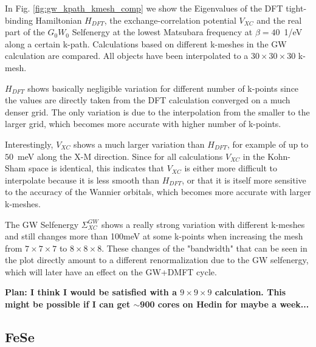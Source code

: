 \documentclass[12pt,a4paper]{scrartcl}
\numberwithin{equation}{section}
\begin{document}
In Fig. \ref{fig:gw_kpath_kmesh_comp} we show 
the Eigenvalues of the DFT tight-binding Hamiltonian $H_{DFT}$,
the exchange-correlation potential $V_{XC}$ and the real part of the $G_0W_0$ 
Selfenergy at the lowest Matsubara frequency at $\beta=40$\ 1/eV
along a certain k-path. Calculations based on different k-meshes in the GW calculation
are compared.
All objects have been interpolated to a $30\times30\times30$ k-mesh.

$H_{DFT}$ shows basically negligible variation for different number of k-points 
since the values are directly taken from the DFT calculation converged on a much denser grid.
The only variation is due to the interpolation from the smaller to the larger grid,
which becomes more accurate  with higher number of k-points.

Interestingly, $V_{XC}$ shows a much larger variation than $H_{DFT}$, for example of up 
to $50$~meV along the X-M direction. Since for all calculations $V_{XC}$ in the Kohn-Sham
space is identical, this indicates that $V_{XC}$ is either more difficult to interpolate
because it is less smooth than $H_{DFT}$, or that it is itself
more sensitive to the accuracy of the Wannier orbitals, which becomes more accurate
with larger k-meshes.
 
The GW Selfenergy $\Sigma^{GW}_{XC}$ shows a really strong variation with different k-meshes
and still changes more than 100meV at some k-points when increasing the mesh
from $7\times 7 \times 7$ to $8\times 8 \times 8$.
These changes of the "bandwidth" that can be seen in the plot directly amount to a different 
renormalization due to the GW selfenergy, which will later have an effect
on the GW+DMFT cycle.

\bigskip

\textbf{Plan: I think I would be satisfied with a $9\times 9  \times 9$
calculation. This might be possible if I can get $\sim$900 cores on Hedin for maybe a week...}



\clearpage

\subsection{FeSe}
\end{document}
